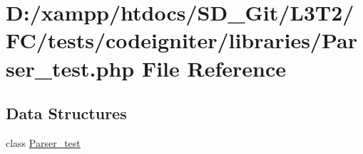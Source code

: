\hypertarget{tests_2codeigniter_2libraries_2_parser__test_8php}{}\section{D\+:/xampp/htdocs/\+S\+D\+\_\+\+Git/\+L3\+T2/\+F\+C/tests/codeigniter/libraries/\+Parser\+\_\+test.php File Reference}
\label{tests_2codeigniter_2libraries_2_parser__test_8php}
\subsection*{Data Structures}
\begin{DoxyCompactItemize}
\item 
class \hyperlink{class_parser__test}{Parser\+\_\+test}
\end{DoxyCompactItemize}
